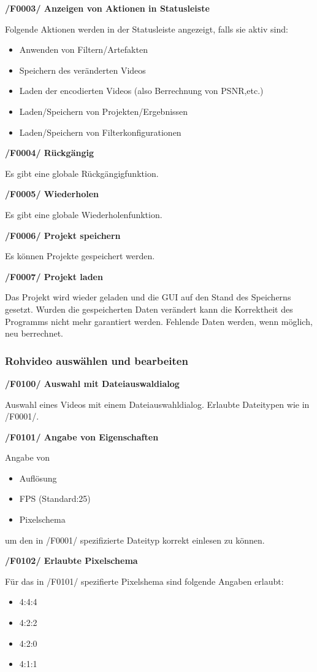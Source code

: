 \documentclass[parskip=full]{scrartcl}
\begin{document}
\textbf{/F0003/ Anzeigen von Aktionen in Statusleiste}

Folgende Aktionen werden in der Statusleiste angezeigt, falls sie aktiv sind:
\begin{itemize}
\item Anwenden von Filtern/Artefakten
\item Speichern des veränderten Videos
\item Laden der encodierten Videos (also Berrechnung von PSNR,etc.)
\item Laden/Speichern von Projekten/Ergebnissen
\item Laden/Speichern von Filterkonfigurationen
\end{itemize}

\textbf{/F0004/ Rückgängig}

Es gibt eine globale Rückgängigfunktion.

\textbf{/F0005/ Wiederholen}

Es gibt eine globale Wiederholenfunktion.

\textbf{/F0006/ Projekt speichern}

Es können Projekte gespeichert werden.

\textbf{/F0007/ Projekt laden}

Das Projekt wird wieder geladen und die GUI auf den Stand des
Speicherns gesetzt. Wurden die gespeicherten Daten verändert kann die Korrektheit
des Programms nicht mehr garantiert werden. Fehlende Daten werden, wenn möglich, neu berrechnet. 

\subsubsection{Rohvideo auswählen und bearbeiten}
\textbf{/F0100/ Auswahl mit Dateiauswaldialog}

Auswahl eines Videos mit einem Dateiauswahldialog. Erlaubte Dateitypen wie in /F0001/.

\textbf{/F0101/ Angabe von Eigenschaften}

Angabe von
\begin{itemize}
\item Auflösung
\item FPS (Standard:25)
\item Pixelschema
\end{itemize}
um den in /F0001/ spezifizierte Dateityp korrekt einlesen zu können.

\textbf{/F0102/ Erlaubte Pixelschema}

Für das in /F0101/ spezifierte Pixelshema sind folgende Angaben erlaubt:
\begin{itemize}
\item 4:4:4
\item 4:2:2
\item 4:2:0
\item 4:1:1
\end{itemize}
\end{document}

